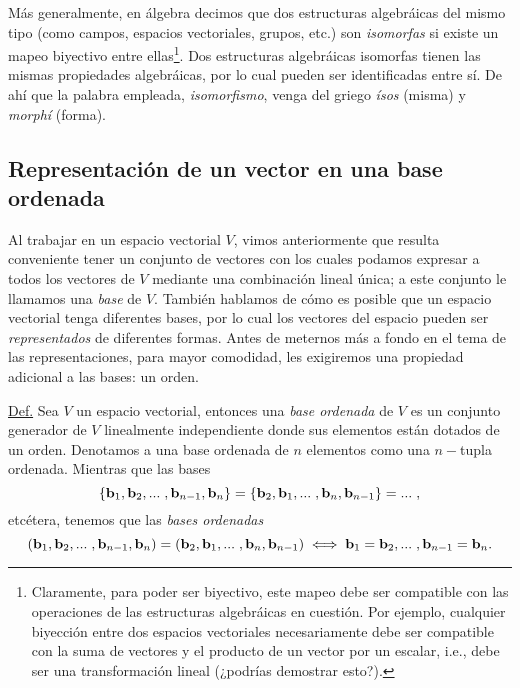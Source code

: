 \documentclass[12pt]{article}
\begin{document}
Más generalmente, en álgebra decimos que dos estructuras algebráicas del mismo tipo (como campos, espacios vectoriales, grupos, etc.) son \emph{isomorfas} si existe un mapeo biyectivo entre ellas\footnote{Claramente, para poder ser biyectivo, este mapeo debe ser compatible con las operaciones de las estructuras algebráicas en cuestión. Por ejemplo, cualquier biyección entre dos espacios vectoriales necesariamente debe ser compatible con la suma de vectores y el producto de un vector por un escalar, i.e., debe ser una transformación lineal (¿podrías demostrar esto?).}. Dos estructuras algebráicas isomorfas tienen las mismas propiedades algebráicas, por lo cual pueden ser identificadas entre sí. De ahí que la palabra empleada, \emph{isomorfismo}, venga del griego \emph{ísos} (misma) y \emph{morphí} (forma). 

\subsection{Representación de un vector en una base ordenada}

Al trabajar en un espacio vectorial $V$, vimos anteriormente que resulta conveniente tener un conjunto de vectores con los cuales podamos expresar a todos los vectores de $V$ mediante una combinación lineal única; a este conjunto le llamamos una \emph{base} de $V$. También hablamos de cómo es posible que un espacio vectorial tenga diferentes bases, por lo cual los vectores del espacio pueden ser \emph{representados} de diferentes formas. Antes de meternos más a fondo en el tema de las representaciones, para mayor comodidad, les exigiremos una propiedad adicional a las bases: un orden.

\begin{tcolorbox}
    \underline{Def.} Sea $V$ un espacio vectorial, entonces una \emph{base ordenada} de $V$ es un conjunto generador de $V$ linealmente independiente donde sus elementos están dotados de un orden. Denotamos a una base ordenada de $n$ elementos como una $n-$tupla ordenada. Mientras que las bases \[
        \{\mathbf{b}_1, \mathbf{b}_2, ...\hspace{1mm},\mathbf{b}_{n-1}, \mathbf{b}_n\} = \{\mathbf{b}_2,\mathbf{b}_{1},...\hspace{1mm},\mathbf{b}_n,\mathbf{b}_{n-1}\} = ...\hspace{1mm}   
    ,\] \noindent etcétera, tenemos que las \emph{bases ordenadas} \[
    (\mathbf{b}_1,\mathbf{b}_2,...\hspace{1mm},\mathbf{b}_{n-1},\mathbf{b}_n)=(\mathbf{b}_2,\mathbf{b}_1,...\hspace{1mm},\mathbf{b}_n,\mathbf{b}_{n-1})\iff\mathbf{b}_1 = \mathbf{b}_2, ...\hspace{1mm}, \mathbf{b}_{n-1} = \mathbf{b}_n 
    .\]  

\vspace{3mm}

\end{tcolorbox}
\end{document}

